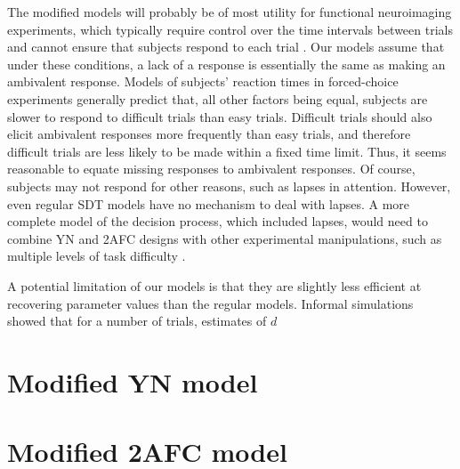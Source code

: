 \documentclass[man]{apa6}
\begin{document}
The modified models will probably be of most utility for functional neuroimaging experiments, which typically require control over the time intervals between trials and cannot ensure that subjects respond to each trial \parencite[e.g.][]{kreitewolfhemispheric2014}. Our models assume that under these conditions, a lack of a response is essentially the same as making an ambivalent response. Models of subjects' reaction times in forced-choice experiments \parencite[e.g.,][]{} generally predict that, all other factors being equal, subjects are slower to respond to difficult trials than easy trials. Difficult trials should also elicit ambivalent responses more frequently than easy trials, and therefore difficult trials are less likely to be made within a fixed time limit. Thus, it seems reasonable to equate missing responses to ambivalent responses. Of course, subjects may not respond for other reasons, such as lapses in attention. However, even regular SDT models have no mechanism to deal with lapses. A more complete model of the decision process, which included lapses, would need to combine YN and 2AFC designs with other experimental manipulations, such as multiple levels of task difficulty \parencite[see][]{}.

A potential limitation of our models is that they are slightly less efficient at recovering parameter values than the regular models. Informal simulations showed that for a number of trials, estimates of $d$

\appendix
\label{app:b}
\section{Modified YN model}

\appendix
\appendix
\label{app:c}
\section{Modified 2AFC model}

\end{document}
